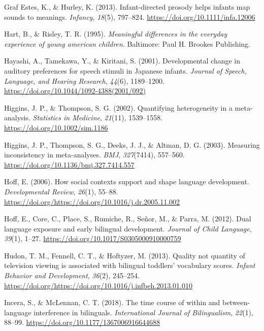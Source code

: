 \documentclass[,man,floatsintext]{apa6}
\begin{document}
\leavevmode\hypertarget{ref-graf_estes_2013}{}%
Graf Estes, K., \& Hurley, K. (2013). Infant-directed prosody helps infants map sounds to meanings. \emph{Infancy}, \emph{18}(5), 797--824. \url{https://doi.org/10.1111/infa.12006}

\leavevmode\hypertarget{ref-hart_1995}{}%
Hart, B., \& Risley, T. R. (1995). \emph{Meaningful differences in the everyday experience of young american children}. Baltimore: Paul H. Brookes Publishing.

\leavevmode\hypertarget{ref-hayashi_2001}{}%
Hayashi, A., Tamekawa, Y., \& Kiritani, S. (2001). Developmental change in auditory preferences for speech stimuli in Japanese infants. \emph{Journal of Speech, Language, and Hearing Research}, \emph{44}(6), 1189--1200. \url{https://doi.org/10.1044/1092-4388(2001/092)}

\leavevmode\hypertarget{ref-higgins_2002}{}%
Higgins, J. P., \& Thompson, S. G. (2002). Quantifying heterogeneity in a meta-analysis. \emph{Statistics in Medicine}, \emph{21}(11), 1539--1558. \url{https://doi.org/10.1002/sim.1186}

\leavevmode\hypertarget{ref-higgins_2003}{}%
Higgins, J. P., Thompson, S. G., Deeks, J. J., \& Altman, D. G. (2003). Measuring inconsistency in meta-analyses. \emph{BMJ}, \emph{327}(7414), 557--560. \url{https://doi.org/10.1136/bmj.327.7414.557}

\leavevmode\hypertarget{ref-hoff_2006}{}%
Hoff, E. (2006). How social contexts support and shape language development. \emph{Developmental Review}, \emph{26}(1), 55--88. \url{https://doi.org/https://doi.org/10.1016/j.dr.2005.11.002}

\leavevmode\hypertarget{ref-hoff_2012}{}%
Hoff, E., Core, C., Place, S., Rumiche, R., Señor, M., \& Parra, M. (2012). Dual language exposure and early bilingual development. \emph{Journal of Child Language}, \emph{39}(1), 1--27. \url{https://doi.org/10.1017/S0305000910000759}

\leavevmode\hypertarget{ref-hudon_2013}{}%
Hudon, T. M., Fennell, C. T., \& Hoftyzer, M. (2013). Quality not quantity of television viewing is associated with bilingual toddlers' vocabulary scores. \emph{Infant Behavior and Development}, \emph{36}(2), 245--254. \url{https://doi.org/https://doi.org/10.1016/j.infbeh.2013.01.010}

\leavevmode\hypertarget{ref-incera_2018}{}%
Incera, S., \& McLennan, C. T. (2018). The time course of within and between-language interference in bilinguals. \emph{International Journal of Bilingualism}, \emph{22}(1), 88--99. \url{https://doi.org/10.1177/1367006916644688}
\end{document}
